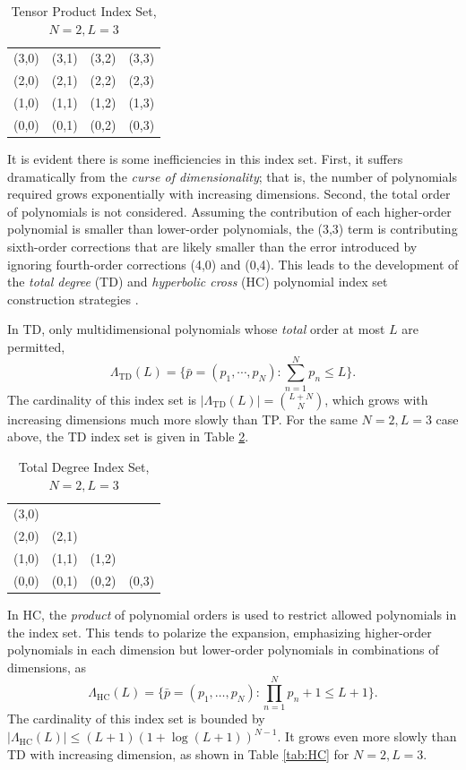 \begin{table}[h]
  \centering
  \begin{tabular}{c c c c}
    (3,0) & (3,1) & (3,2) & (3,3) \\
    (2,0) & (2,1) & (2,2) & (2,3) \\
    (1,0) & (1,1) & (1,2) & (1,3) \\
    (0,0) & (0,1) & (0,2) & (0,3)
  \end{tabular}
  \caption{Tensor Product Index Set, $N=2,L=3$}
  \label{tab:TP}
\end{table}

It is evident there is some inefficiencies in this index set.  First, it suffers dramatically from the
\emph{curse of dimensionality}; that is, the number of polynomials required grows exponentially with
increasing dimensions.  Second, the total order of polynomials is not considered.  Assuming the contribution of
each higher-order polynomial is smaller than lower-order polynomials, the (3,3) term is
contributing sixth-order corrections that are likely smaller than the error introduced by ignoring
fourth-order corrections (4,0) and (0,4).  This leads to the development of the \emph{total degree} (TD) and
\emph{hyperbolic cross} (HC) polynomial index set construction strategies \cite{hctd}.

In TD, only multidimensional polynomials whose \emph{total} order at most $L$ are permitted,
\begin{equation}
  \Lambda_\text{TD}(L)=\Big\{\bar p=(p_1,\cdots,p_N):\sum_{n=1}^N p_n \leq L
\Big\}.
\end{equation}
The cardinality of this index set is $|\Lambda_\text{TD}(L)|={L+N\choose N}$, which grows with increasing
dimensions much more slowly than TP.  For the same $N=2,L=3$ case above, the TD index set is given in Table
\ref{tab:TD}. 

\begin{table}[h]
  \centering
  \begin{tabular}{c c c c}
    (3,0) &       &       &       \\
    (2,0) & (2,1) &       &       \\
    (1,0) & (1,1) & (1,2) &       \\
    (0,0) & (0,1) & (0,2) & (0,3)
  \end{tabular}
  \caption{Total Degree Index Set, $N=2,L=3$}
  \label{tab:TD}
\end{table}

In HC, the \emph{product} of polynomial orders is used to restrict allowed polynomials in the index set.  This
tends to polarize the expansion, emphasizing higher-order polynomials in each dimension but lower-order
polynomials in combinations of dimensions, as
\begin{equation}
  \Lambda_\text{HC}(L)=\Big\{\bar p=(p_1,\ldots,p_N):\prod_{n=1}^N p_n+1 \leq L+1
\Big\}.
\end{equation}
The cardinality of this index set is bounded by $|\Lambda_\text{HC}(L)|\leq (L+1)(1+\log(L+1))^{N-1}$. It
grows even more slowly than TD with increasing dimension, as shown in Table \ref{tab:HC} for $N=2,L=3$.

